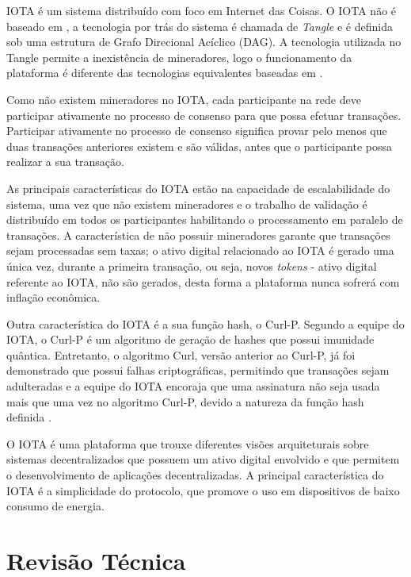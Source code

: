 \documentclass[tcc,capa]{texufpel}
\begin{document}
    IOTA é um sistema distribuído com foco em Internet das Coisas. O IOTA não é baseado em \bchain, a tecnologia por trás do sistema é chamada de \textit{Tangle} e é definida sob uma estrutura de Grafo Direcional Acíclico (DAG). A tecnologia utilizada no Tangle permite a inexistência de mineradores, logo o funcionamento da plataforma é diferente das tecnologias equivalentes baseadas em \bchain.
    
    Como não existem mineradores no IOTA, cada participante na rede deve participar ativamente no processo de consenso para que possa efetuar transações. Participar ativamente no processo de consenso significa provar pelo menos que duas transações anteriores existem e são válidas, antes que o participante possa realizar a sua transação.
    
    As principais características do IOTA estão na capacidade de escalabilidade do sistema, uma vez que não existem mineradores e o trabalho de validação é distribuído em todos os participantes habilitando o processamento em paralelo de transações. A característica de não possuir mineradores garante que transações sejam processadas sem taxas; o ativo digital relacionado ao IOTA é gerado uma única vez, durante a primeira transação, ou seja, novos \textit{tokens} - ativo digital referente ao IOTA, não são gerados, desta forma a plataforma nunca sofrerá com inflação econômica.
    
    Outra característica do IOTA é a sua função hash, o Curl-P. Segundo a equipe do IOTA, o Curl-P é um algoritmo de geração de hashes que possui imunidade quântica. Entretanto, o algoritmo Curl, versão anterior ao Curl-P, já foi demonstrado que possui falhas criptográficas, permitindo que transações sejam adulteradas \cite{heilman} e a equipe do IOTA encoraja que uma assinatura não seja usada mais que uma vez no algoritmo Curl-P, devido a natureza da função hash definida \cite{teamiota}.
    
    O IOTA é uma plataforma que trouxe diferentes visões arquiteturais sobre sistemas decentralizados que possuem um ativo digital envolvido e que permitem o desenvolvimento de aplicações decentralizadas. A principal característica do IOTA é a simplicidade do protocolo, que promove o uso em dispositivos de baixo consumo de energia.
    
\chapter{Revisão Técnica}\label{chap:revisao-tecnica}
\end{document}
